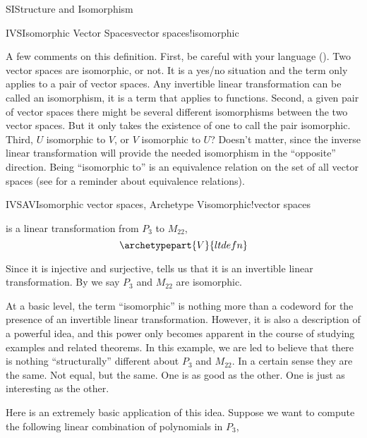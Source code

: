 \begin{subsect}{SI}{Structure and Isomorphism}
\begin{definition}{IVS}{Isomorphic Vector Spaces}{vector spaces!isomorphic}
\end{definition}
%
\begin{para}A few comments on this definition.  First, be careful with your language ().  Two vector spaces are isomorphic, or not.  It is a yes/no situation and the term only applies to a pair of vector spaces.  Any invertible linear transformation can be called an isomorphism, it is a term that applies to functions.  Second, a given pair of vector spaces there might be several different isomorphisms between the two vector spaces.  But it only takes the existence of one to call the pair isomorphic.  Third,  $U$ isomorphic to $V$, or $V$ isomorphic to $U$?  Doesn't matter, since the inverse linear transformation will provide the needed isomorphism in the ``opposite'' direction.  Being ``isomorphic to'' is an equivalence relation on the set of all vector spaces (see  for a reminder about equivalence relations).\end{para}
%
\begin{example}{IVSAV}{Isomorphic vector spaces, Archetype V}{isomorphic!vector spaces}
\begin{para} is a linear transformation from $P_3$ to $M_{22}$,
%
\begin{equation*}
\archetypepart{V}{ltdefn}\end{equation*}
\end{para}
%
\begin{para}Since it is injective and surjective,  tells us that it is an invertible linear transformation.  By  we say $P_3$ and $M_{22}$ are isomorphic.\end{para}
%
\begin{para}At a basic level, the term ``isomorphic'' is nothing more than a codeword for the presence of an invertible linear transformation.  However, it is also a description of a powerful idea, and this power only becomes apparent in the course of studying examples and related theorems.  In this example, we are led to believe that there is nothing ``structurally'' different about $P_3$ and $M_{22}$.  In a certain sense they are the same.  Not equal, but the same.  One is as good as the other.  One is just as interesting as the other.\end{para}
%
\begin{para}Here is an extremely basic application of this idea.  Suppose we want to compute the following linear combination of polynomials in $P_3$,

\end{para}
\end{example}
\end{subsect}
